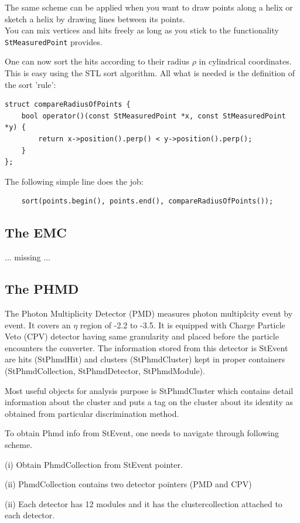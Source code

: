 \documentclass[twoside]{article}
\begin{document}
The same scheme can be applied when you want to draw points along a helix
or sketch a helix by drawing lines between its points.\\
You can mix vertices and hits freely as long as you stick to the functionality
\texttt{StMeasuredPoint} provides.

One can now sort the hits according to their radius $\rho$ in cylindrical
coordinates. This is easy using the STL sort algorithm. All what is
needed is the definition of the sort 'rule': 
\begin{verbatim}
struct compareRadiusOfPoints {
    bool operator()(const StMeasuredPoint *x, const StMeasuredPoint *y) {
        return x->position().perp() < y->position().perp();
    }
};
\end{verbatim}
The following simple line does the job:
\begin{verbatim}
    sort(points.begin(), points.end(), compareRadiusOfPoints());
\end{verbatim}
\vfill
\subsection{The EMC}
... missing ...
\vfill
\subsection{The PHMD}
The Photon Multiplicity Detector (PMD) measures photon multiplcity event by event. It covers 
an $\eta$ region of -2.2 to -3.5. It is equipped with Charge Particle Veto (CPV) detector
 having same granularity and placed before the particle encounters the converter.
The information stored from this detector is StEvent are
 hits (StPhmdHit) and clusters (StPhmdCluster) kept in proper containers (StPhmdCollection,
StPhmdDetector, StPhmdModule). 

Most useful objects for analysis purpose is StPhmdCluster which contains detail information 
about the cluster and puts a tag on the cluster about its identity as obtained from particular
discrimination method.

To obtain Phmd info from StEvent, one needs to navigate through following scheme.

(i) Obtain PhmdCollection from StEvent pointer.

(ii) PhmdCollection contains two detector pointers (PMD and CPV) 

(ii) Each detector has 12 modules and it has the clustercollection attached to each detector.
\end{document}
